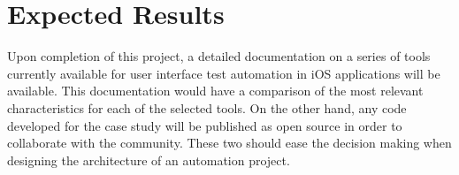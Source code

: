 \section{Expected Results}
Upon completion of this project, a detailed documentation on a series of tools currently available for user interface test automation in iOS applications will be available. This documentation would have a comparison of the most relevant characteristics for each of the selected tools. On the other hand, any code developed for the case study will be published as open source in order to collaborate with the community. These two should ease the decision making when designing the architecture of an automation project.